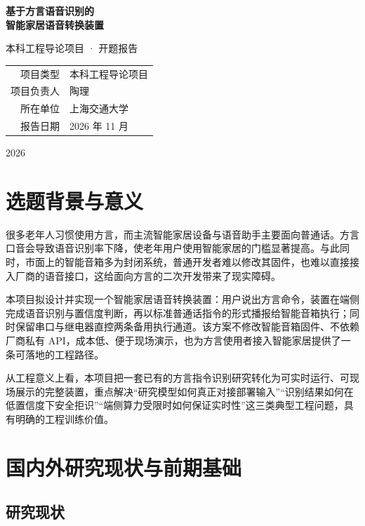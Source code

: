 \documentclass[UTF8,a4paper,12pt,fontset=fandol]{ctexart}
\begin{document}
\begin{titlepage}
  \centering
  \vspace*{3.2cm}
  {\bfseries 基于方言语音识别的\\[0.3em]智能家居语音转换装置\par}
  \vspace{1.6cm}
  { 本科工程导论项目 · 开题报告\par}
  \vspace{2.2cm}
  \begin{tabular}{rl}
    项目类型 & 本科工程导论项目 \\
    项目负责人 & 陶理 \\
    所在单位 & 上海交通大学 \\
    报告日期 & 2026 年 11 月 \\
  \end{tabular}
  \vfill
  { 2026}
\end{titlepage}

\tableofcontents
\newpage

\section{选题背景与意义}

很多老年人习惯使用方言，而主流智能家居设备与语音助手主要面向普通话。方言口音会导致语音识别率下降，使老年用户使用智能家居的门槛显著提高。与此同时，市面上的智能音箱多为封闭系统，普通开发者难以修改其固件，也难以直接接入厂商的语音接口，这给面向方言的二次开发带来了现实障碍。

本项目拟设计并实现一个智能家居语音转换装置：用户说出方言命令，装置在端侧完成语音识别与置信度判断，再以标准普通话指令的形式播报给智能音箱执行；同时保留串口与继电器直控两条备用执行通道。该方案不修改智能音箱固件、不依赖厂商私有 API，成本低、便于现场演示，也为方言使用者接入智能家居提供了一条可落地的工程路径。

从工程意义上看，本项目把一套已有的方言指令识别研究转化为可实时运行、可现场展示的完整装置，重点解决“研究模型如何真正对接部署输入”“识别结果如何在低置信度下安全拒识”“端侧算力受限时如何保证实时性”这三类典型工程问题，具有明确的工程训练价值。

\section{国内外研究现状与前期基础}

\subsection{研究现状}
\end{document}

